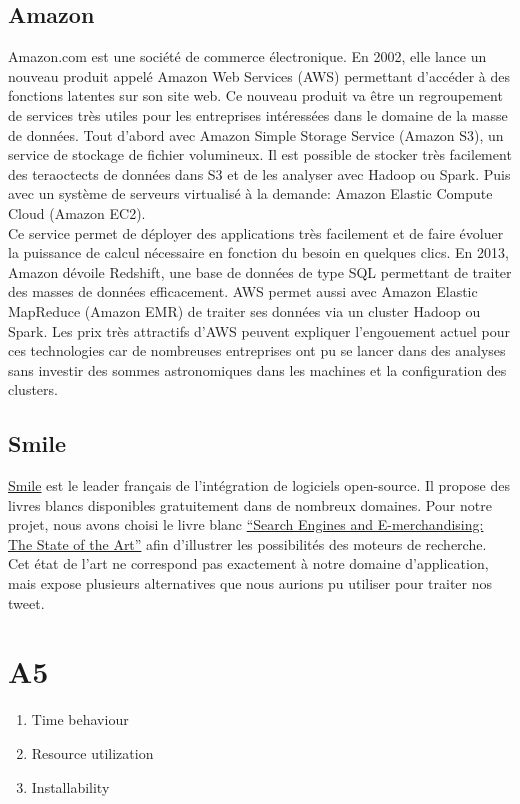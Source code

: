   \subsection{Amazon}
    Amazon.com est une société de commerce électronique. En 2002, elle lance un nouveau produit appelé Amazon Web Services (AWS) permettant d’accéder à des fonctions latentes sur son site web. Ce nouveau produit va être un regroupement de services très utiles pour les entreprises intéressées dans le domaine de la masse de données. Tout d'abord avec Amazon Simple Storage Service (Amazon S3), un service de stockage de fichier volumineux. Il est possible de stocker très facilement des teraoctects de données dans S3 et de les analyser avec Hadoop ou Spark. Puis avec un système de serveurs virtualisé à la demande: Amazon Elastic Compute Cloud (Amazon EC2). \\

    Ce service permet de déployer des applications très facilement et de faire évoluer la puissance de calcul nécessaire en fonction du besoin en quelques clics. En 2013, Amazon dévoile Redshift, une base de données de type SQL permettant de traiter des masses de données efficacement. AWS permet aussi avec Amazon Elastic MapReduce (Amazon EMR) de traiter ses données via un cluster Hadoop ou Spark. Les prix très attractifs d'AWS peuvent expliquer l'engouement actuel pour ces technologies car de nombreuses entreprises ont pu se lancer dans des analyses sans investir des sommes astronomiques dans les machines et la configuration des clusters.

  \subsection{Smile}
    \href{http://www.smile.fr/}{Smile} est le leader français de l'intégration de logiciels open-source. Il propose des livres blancs disponibles gratuitement dans de nombreux domaines. Pour notre projet, nous avons choisi le livre blanc \href{http://www.smile.fr/Livres-blancs}{``Search Engines and E-merchandising: The State of the Art''} afin d'illustrer les possibilités des moteurs de recherche. Cet état de l'art ne correspond pas exactement à notre domaine d'application, mais expose plusieurs alternatives que nous aurions pu utiliser pour traiter nos tweet.

\section{A5}
  \begin{enumerate}
    \item Time behaviour
    \item Resource utilization
    \item Installability
  \end{enumerate}

